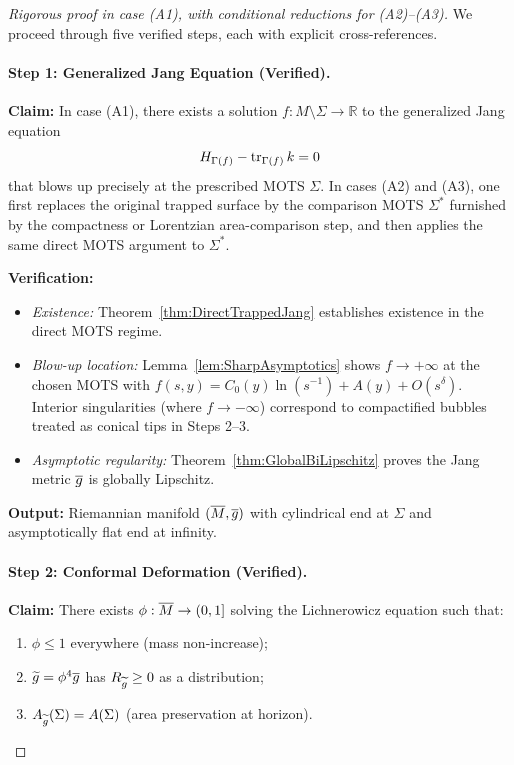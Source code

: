 \begin{proof}[Rigorous proof in case (A1), with conditional reductions for (A2)--(A3)]
We proceed through five verified steps, each with explicit cross-references.

\paragraph{Step 1: Generalized Jang Equation (Verified).}
\textbf{Claim:} In case (A1), there exists a solution $f: M \setminus \Sigma \to \mathbb{R}$ to the generalized Jang equation
\begin{equation}
    H_{\Gamma(f)} - \operatorname{tr}_{\Gamma(f)} k = 0
\end{equation}
that blows up precisely at the prescribed MOTS $\Sigma$. In cases (A2) and (A3), one first replaces the original trapped surface by the comparison MOTS $\Sigma^*$ furnished by the compactness or Lorentzian area-comparison step, and then applies the same direct MOTS argument to $\Sigma^*$.

\textbf{Verification:}
\begin{itemize}
    \item \textit{Existence:} Theorem~\ref{thm:DirectTrappedJang} establishes existence in the direct MOTS regime.
    \item \textit{Blow-up location:} Lemma~\ref{lem:SharpAsymptotics} shows $f \to +\infty$ at the chosen MOTS with $f(s,y) = C_0(y) \ln(s^{-1}) + A(y) + O(s^\delta)$. Interior singularities (where $f \to -\infty$) correspond to compactified bubbles treated as conical tips in Steps 2--3.
    \item \textit{Asymptotic regularity:} Theorem~\ref{thm:GlobalBiLipschitz} proves the Jang metric $\overline{g}$ is globally Lipschitz.
\end{itemize}
\textbf{Output:} Riemannian manifold $(\overline{M}, \overline{g})$ with cylindrical end at $\Sigma$ and asymptotically flat end at infinity.

\paragraph{Step 2: Conformal Deformation (Verified).}
\textbf{Claim:} There exists $\phi: \overline{M} \to (0,1]$ solving the Lichnerowicz equation such that:
\begin{enumerate}
    \item $\phi \le 1$ everywhere (mass non-increase);
    \item $\widetilde{g} = \phi^4 \overline{g}$ has $R_{\widetilde{g}} \ge 0$ as a distribution;
    \item $A_{\widetilde{g}}(\Sigma) = A(\Sigma)$ (area preservation at horizon).
\end{enumerate}


\end{proof}
